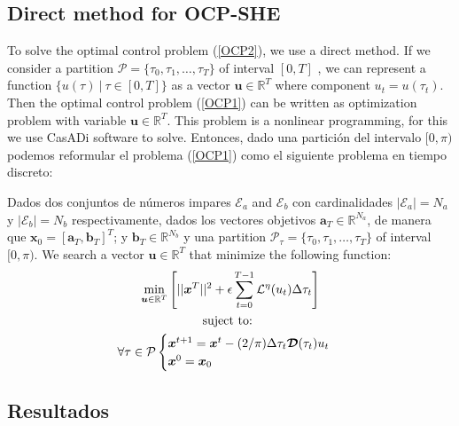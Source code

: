 \subsection{Direct method  for  OCP-SHE}

To solve the optimal control problem (\ref{OCP2}), we use a direct method. 
%
If we consider a partition $\mathcal{P} = \{\tau_0,\tau_1,\dots,\tau_{T}\}$ of interval $[0,T]$ , we can represent a function $\{ u(\tau) \ | \ \tau \in [0,T]\}$ as a vector $\bm{u} \in \mathbb{R}^{T}$ where component $u_t = u(\tau_t)$. 
%
Then the optimal control problem (\ref{OCP1}) can be written as optimization problem with variable $\bm{u} \in \mathbb{R}^{T}$. This problem is a nonlinear programming, for this we use CasADi software to solve. 
%
Entonces, dado una partición del intervalo $[0,\pi)$ podemos reformular el problema (\ref{OCP1}) como el siguiente problema en tiempo discreto:
\newline
\begin{problem}
    Dados dos conjuntos de números impares $\mathcal{E}_a$ and $\mathcal{E}_b$ con cardinalidades $|\mathcal{E}_a| = N_a$ y  $|\mathcal{E}_b| = N_b$ respectivamente, dados los vectores objetivos $\bm{a}_T  \in \mathbb{R}^{N_a}$, de manera que $\bm{x}_0 = [\bm{a}_T,\bm{b}_T]^T$; y $\bm{b}_T  \in \mathbb{R}^{N_b}$ y una  partition $\mathcal{P}_\tau = \{\tau_0,\tau_1,\dots,\tau_{T}\}$ of interval $[0,\pi)$. We search a vector $\bm{u} \in \mathbb{R}^{T}$ that minimize the following function:
    \begin{gather}
        \min_{\bm{u} \in \mathbb{R}^{T} } 
        \Bigg[ 
        || \bm{x}^{T}||^2
        + \epsilon  \sum_{t=0}^{T-1} \mathcal{L}^\eta(u_{t}) \Delta\tau_t  \Bigg]  \\
        \notag \text{suject to: } \\
        \forall \tau \in \mathcal{P} \begin{cases}
            \bm{x}^{t+1} = \bm{x}^{t} - (2/\pi)\Delta \tau_t \bm{\mathcal{D}}(\tau_t)u_t \\
            \bm{x}^0 = \bm{x}_0
        \end{cases} 
    \end{gather}
\end{problem}



\subsection{Resultados}

